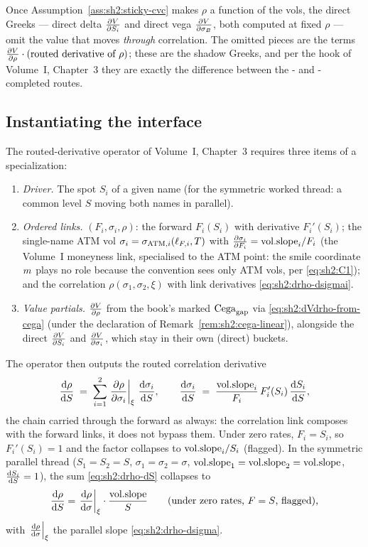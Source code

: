 Once Assumption~\ref{ass:sh2:sticky-cvc} makes $\rho$ a function of the
vols, the direct Greeks --- direct delta $\frac{\partial V}{\partial S_i}$ and direct vega
$\frac{\partial V}{\partial \sigma_B}$, both computed at fixed $\rho$ --- omit the value that moves
\emph{through} correlation. The omitted pieces are the terms
$\frac{\partial V}{\partial \rho} \cdot (\text{routed derivative of } \rho)$; these are the
shadow Greeks, and per the hook of Volume~I, Chapter~3 they are exactly the
difference between the \stickycvc{}- and \stickyrho{}-completed routes.

\subsection{Instantiating the interface}\label{sec:sh2:interface}

The routed-derivative operator of Volume~I, Chapter~3 requires three items
of a specialization:
\begin{enumerate}[label=(\alph*)]
\item \emph{Driver.} The spot $S_i$ of a given name (for the symmetric
  worked thread: a common level $S$ moving both names in parallel).
\item \emph{Ordered links.} $(F_i, \sigma_i, \rho)$:
  the forward $F_i(S_i)$ with derivative $F_i'(S_i)$; the single-name ATM
  vol $\sigma_i = \sigma_{\mathrm{ATM},i}(\ell_{F,i}, T)$ with
  $\frac{\partial \sigma_i}{\partial F_i} = \mathrm{vol.slope}_i / F_i$ (the Volume~I moneyness link,
  specialised to the ATM point: the smile coordinate $m$ plays no role
  because the convention sees only ATM vols, per \eqref{eq:sh2:C1}); and
  the correlation $\rho(\sigma_1, \sigma_2, \xi)$ with link derivatives
  \eqref{eq:sh2:drho-dsigmai}.
\item \emph{Value partials.} $\frac{\partial V}{\partial \rho}$ from the book's marked
  $\mathrm{Cega}_{\mathrm{gap}}$ via \eqref{eq:sh2:dVdrho-from-cega} (under the declaration
  of Remark~\ref{rem:sh2:cega-linear}), alongside the direct
  $\frac{\partial V}{\partial S_i}$ and $\frac{\partial V}{\partial \sigma_i}$, which stay in their own (direct)
  buckets.
\end{enumerate}
The operator then outputs the routed correlation derivative
\begin{equation}\label{eq:sh2:drho-dS}
  \frac{\mathrm{d} \rho}{\mathrm{d} S}
  \;=\; \sum_{i=1}^{2}
    \left.\frac{\partial \rho}{\partial \sigma_i}\right|_{\xi}\, \frac{\mathrm{d} \sigma_i}{\mathrm{d} S},
  \qquad
  \frac{\mathrm{d} \sigma_i}{\mathrm{d} S}
  \;=\; \frac{\mathrm{vol.slope}_i}{F_i}\, F_i'(S_i)\,\frac{\mathrm{d} S_i}{\mathrm{d} S},
\end{equation}
the chain carried through the forward as always: the correlation link
composes with the forward links, it does not bypass them. Under zero rates,
$F_i = S_i$, so $F_i'(S_i) = 1$ and the factor collapses to
$\mathrm{vol.slope}_i / S_i$ (flagged). In the symmetric parallel thread
($S_1 = S_2 = S$, $\sigma_1 = \sigma_2 = \sigma$,
$\mathrm{vol.slope}_1 = \mathrm{vol.slope}_2 = \mathrm{vol.slope}$, $\frac{\mathrm{d} S_i}{\mathrm{d} S} = 1$), the sum
\eqref{eq:sh2:drho-dS} collapses to
\begin{equation}\label{eq:sh2:drho-dS-symmetric}
  \frac{\mathrm{d} \rho}{\mathrm{d} S}
  = \left.\frac{\mathrm{d} \rho}{\mathrm{d} \sigma}\right|_{\xi} \cdot \frac{\mathrm{vol.slope}}{S}
  \qquad \text{(under zero rates, $F = S$, flagged),}
\end{equation}
with $\left.\frac{\mathrm{d} \rho}{\mathrm{d} \sigma}\right|_{\xi}$ the parallel slope
\eqref{eq:sh2:drho-dsigma}.

